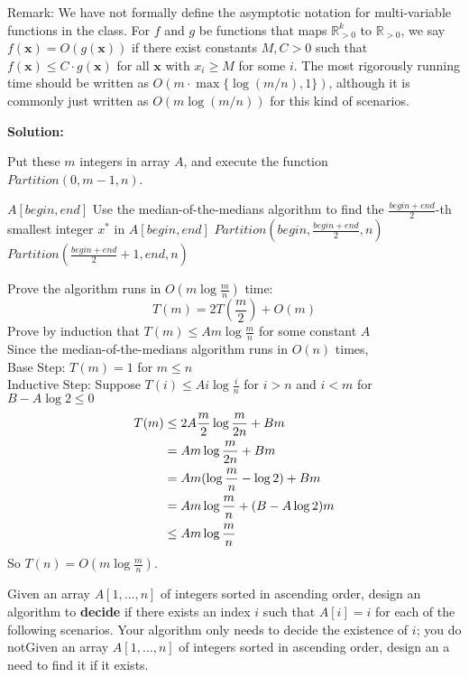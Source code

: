 \documentclass{oxmathproblems}
\begin{document}
\begin{questions}
Remark: We have not formally define the asymptotic notation for multi-variable functions in the class.
For $f$ and $g$ be functions that maps $\mathbb{R}_{>0}^k$ to $\mathbb{R}_{>0}$, we say $f(\mathbf{x})=O(g(\mathbf{x}))$ if there exist constants $M,C>0$ such that $f(\mathbf{x})\leq C\cdot g(\mathbf{x})$ for all $\mathbf{x}$ with $x_i\geq M$ for some $i$.
The most rigorously running time should be written as $O(m\cdot\max\{\log(m/n),1\})$, although it is commonly just written as $O(m\log(m/n))$ for this kind of scenarios.

\textbf{Solution:}

Put these $m$ integers in array $A$, and execute the function $Partition(0, m-1, n)$.
\begin{breakablealgorithm}
\caption{$Partition(begin, end, n)$}
\begin{algorithmic}[1]
\RETURN $A[begin, end]$
\ELSE
\STATE Use the median-of-the-medians algorithm to find the $\frac{begin+end}{2}$-th smallest integer $x^*$ in $A[begin, end]$
\STATE $Partition(begin, \frac{begin+end}{2}, n)$
\STATE $Partition(\frac{begin+end}{2}+1, end, n)$
\ENDIF
\end{algorithmic}
\end{breakablealgorithm}
Prove the algorithm runs in $O(m\log\frac{m}{n})$ time:
$$T(m) = 2T(\frac{m}{2}) + O(m)$$
Prove by induction that $T(m) \leq Am\log\frac{m}{n}$ for some constant $A$ \\
Since the median-of-the-medians algorithm runs in $O(n)$ times, \\
Base Step: $T(m) = 1$ for $m \leq n$ \\
Inductive Step: Suppose $T(i) \leq Ai\log\frac{i}{n}$ for $i > n$ and $i < m$ for $B-A\log2 \leq 0$
\begin{align}
  T(m) &\leq 2A\frac{m}{2}\log\frac{m}{2n} + Bm \notag \\
       &= Am\log\frac{m}{2n} + Bm \notag \\
       &= Am(\log\frac{m}{n} - \log2) + Bm \notag \\
       &= Am\log\frac{m}{n} + (B-A\log2)m \notag \\
       &\leq Am\log\frac{m}{n} \notag
\end{align}
So $T(n) = O(m\log\frac{m}{n})$.

\miquestion[25]
Given an array $A[1,\ldots,n]$ of integers sorted in ascending order, design an algorithm to \textbf{decide} if there exists an index $i$ such that $A[i]=i$ for each of the following scenarios. Your algorithm only needs to decide the existence of $i$; you do notGiven an array $A[1,\ldots,n]$ of integers sorted in ascending order, design an a need to find it if it exists.
\begin{parts}

\end{parts}
\end{questions}
\end{document}
